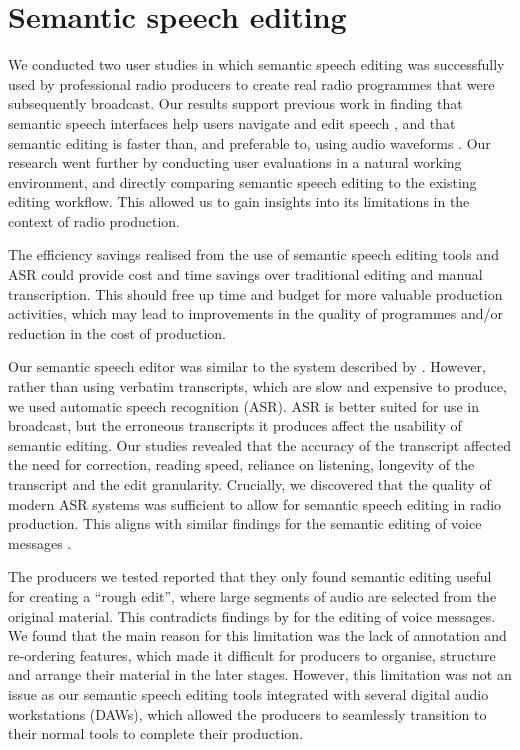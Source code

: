\section{Semantic speech editing}

We conducted two user studies in which semantic speech editing was successfully used by professional radio producers to
create real radio programmes that were subsequently broadcast. Our results support previous work in finding that
semantic speech interfaces help users navigate and edit speech \citep{Whittaker2002}, and that semantic editing is
faster than, and preferable to, using audio waveforms \citep{Whittaker2004,Sivaraman2016}. Our research went further by
conducting user evaluations in a natural working environment, and directly comparing semantic speech editing to the
existing editing workflow. This allowed us to gain insights into its limitations in the context of radio production.

The efficiency savings realised from the use of semantic speech editing tools and ASR could provide cost and time
savings over traditional editing and manual transcription.  This should free up time and budget for more valuable
production activities, which may lead to improvements in the quality of programmes and/or reduction in the cost of
production.

Our semantic speech editor was similar to the system described by \citet{Rubin2013}. However, rather than using
verbatim transcripts, which are slow and expensive to produce, we used automatic speech recognition (ASR). ASR is
better suited for use in broadcast, but the erroneous transcripts it produces affect the usability of semantic editing.
Our studies revealed that the accuracy of the transcript affected the need for correction, reading speed, reliance on
listening, longevity of the transcript and the edit granularity.  Crucially, we discovered that the quality of 
modern ASR systems was sufficient to allow for semantic speech editing in radio production.  This aligns with similar
findings for the semantic editing of voice messages \citep{Whittaker2004,Sivaraman2016}.

The producers we tested reported that they only found semantic editing useful for creating a ``rough edit'', where
large segments of audio are selected from the original material. This contradicts findings by \citet{Sivaraman2016} for
the editing of voice messages.
We found that the main reason for this limitation was the lack of annotation and re-ordering features, which made it
difficult for producers to organise, structure and arrange their material in the later stages.  However, this
limitation was not an issue as our semantic speech editing tools integrated with several digital audio workstations
(DAWs), which allowed the producers to seamlessly transition to their normal tools to complete their production.


